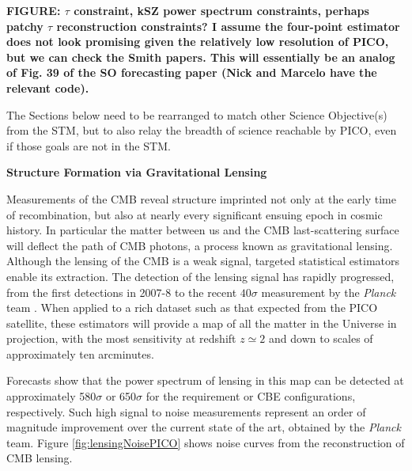 \documentclass[PICOReport.tex]{subfiles}
\begin{document}
\textbf{FIGURE: $\tau$ constraint, kSZ power spectrum constraints, perhaps patchy $\tau$ reconstruction constraints? I assume the four-point estimator does not look promising given the relatively low resolution of PICO, but we can check the Smith papers.  This will essentially be an analog of Fig. 39 of the SO forecasting paper (Nick and Marcelo have the relevant code).}


The Sections below need to be rearranged to match other Science Objective(s) from the STM, but to also relay the 
breadth of science reachable by PICO, even if those goals are not in the STM. 

{\bf Structure Formation via Gravitational Lensing}


Measurements of the CMB reveal structure imprinted not only at the early time of recombination, but also at nearly every significant ensuing epoch in cosmic history.  In particular the matter between us and the CMB last-scattering surface will deflect the path of CMB photons, a process known as gravitational lensing.  Although the lensing of the CMB is a weak signal, targeted statistical estimators enable its  extraction.  
The detection of the lensing signal has rapidly progressed, from the first detections in 2007-8 \citep{2007PhRvD..76d3510S, 2008PhRvD..78d3520H} to the recent $ 40\sigma$ measurement by the {\it Planck} team \cite{2018arXiv180706210P}.  When applied to a rich dataset such as that expected from the PICO satellite, these estimators will provide a map of all the matter in the Universe in projection, with the most sensitivity at redshift $z \simeq 2$ and down to scales of approximately ten arcminutes.  

Forecasts show that the power spectrum of lensing in this map can be detected at approximately 580$\sigma$ or 650$\sigma$ for the requirement or CBE configurations, respectively.  Such high signal to noise measurements represent an order of magnitude improvement over the current state of the art, obtained by the  {\it Planck} team.  Figure \ref{fig:lensingNoisePICO} shows noise curves from the reconstruction of CMB lensing.  
\end{document}
